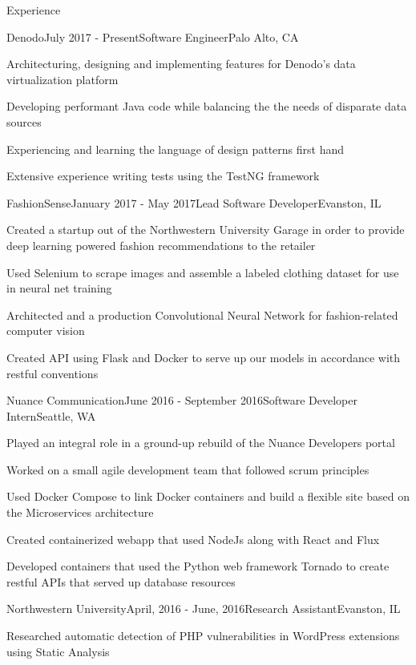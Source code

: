 \documentclass{resume} %
\begin{document}
\begin{rSection}{Experience}

\begin{rSubsection}{Denodo}{July 2017 - Present}{Software Engineer}{Palo Alto, CA}
\item Architecturing, designing and implementing features for Denodo's data virtualization platform
\item Developing performant Java code while balancing the the needs of disparate data sources
\item Experiencing and learning the language of design patterns first hand
\item Extensive experience writing tests using the TestNG framework
\end{rSubsection}

\begin{rSubsection}{FashionSense}{January 2017 - May 2017}{Lead Software Developer}{Evanston, IL}
\item Created a startup out of the Northwestern University Garage in order to provide deep learning powered fashion recommendations to the retailer
\item Used Selenium to scrape images and assemble a labeled clothing dataset for use in neural net training
\item Architected and a production Convolutional Neural Network for fashion-related computer vision
\item Created API using Flask and Docker to serve up our models in accordance with restful conventions
\end{rSubsection}


\begin{rSubsection}{Nuance Communication}{June 2016 - September 2016}{Software Developer Intern}{Seattle, WA}
\item Played an integral role in a ground-up rebuild of the Nuance Developers portal
\item Worked on a small agile development team that followed scrum principles
\item Used Docker Compose to link Docker containers and build a flexible site based on the
Microservices architecture
\item Created containerized webapp that used NodeJs along with React and Flux
\item Developed containers that used the Python web framework Tornado to create restful APIs that served up database resources
\end{rSubsection}


\begin{rSubsection}{Northwestern University}{April, 2016 - June, 2016}{Research Assistant}{Evanston, IL}
\item Researched automatic detection of PHP vulnerabilities in WordPress extensions using Static
Analysis
\end{rSubsection}

\end{rSection}
\end{document}
